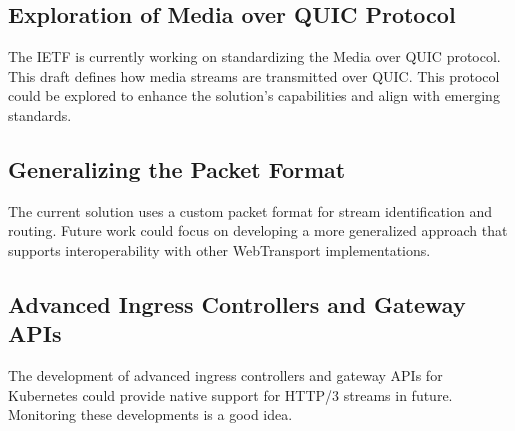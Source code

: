 \subsection{Exploration of Media over QUIC Protocol}
The IETF is currently working on standardizing the Media over QUIC protocol. This draft defines how media streams are transmitted over QUIC. This protocol could be explored to enhance the solution's capabilities and align with emerging standards.

\subsection{Generalizing the Packet Format}
The current solution uses a custom packet format for stream identification and routing. Future work could focus on developing a more generalized approach that supports interoperability with other WebTransport implementations.

\subsection{Advanced Ingress Controllers and Gateway APIs}
The development of advanced ingress controllers and gateway APIs for Kubernetes could provide native support for HTTP/3 streams in future. Monitoring these developments is a good idea.





